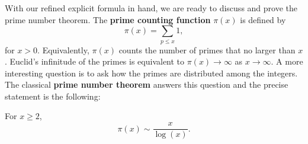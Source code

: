     With our refined explicit formula in hand, we are ready to discuss and prove the prime number theorem. The \textbf{prime counting function} $\pi(x)$ is defined by
    \[
      \pi(x) = \sum_{p \le x}1,
    \]
    for $x > 0$. Equivalently, $\pi(x)$ counts the number of primes that no larger than $x$. Euclid's infinitude of the primes is equivalent to $\pi(x) \to \infty$ as $x \to \infty$. A more interesting question is to ask how the primes are distributed among the integers. The classical \textbf{prime number theorem} answers this question and the precise statement is the following:

    \begin{theorem}
      For $x \ge 2$,
      \[
        \pi(x) \sim \frac{x}{\log(x)}.
      \]
    \end{theorem}

